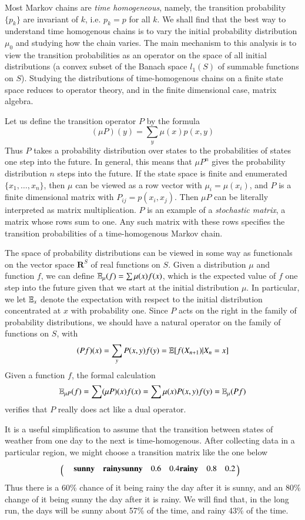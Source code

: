Most Markov chains are \emph{time homogeneous}, namely, the transition probability $\{ p_k \}$ are invariant of $k$, i.e. $p_k = p$ for all $k$. We shall find that the best way to understand time homogenous chains is to vary the initial probability distribution $\mu_0$ and studying how the chain varies. The main mechanism to this analysis is to view the transition probabilities as an operator on the space of all initial distributions (a convex subset of the Banach space $l_1(S)$ of summable functions on $S$). Studying the distributions of time-homogenous chains on a finite state space reduces to operator theory, and in the finite dimensional case, matrix algebra.

Let us define the transition operator $P$ by the formula
%
\[ (\mu P)(y) = \sum_y \mu(x) p(x,y) \]
%
Thus $P$ takes a probability distribution over states to the probabilities of states one step into the future. In general, this means that $\mu P^n$ gives the probability distribution $n$ steps into the future. If the state space is finite and enumerated $\{ x_1, \dots, x_n \}$, then $\mu$ can be viewed as a row vector with $\mu_i = \mu(x_i)$, and $P$ is a finite dimensional matrix with $P_{ij} = p(x_i,x_j)$. Then $\mu P$ can be literally interpreted as matrix multiplication. $P$ is an example of a \emph{stochastic matrix}, a matrix whose rows sum to one. Any such matrix with these rows specifies the transition probabilities of a time-homogenous Markov chain.

The space of probability distributions can be viewed in some way as functionals on the vector space $\mathbf{R}^S$ of real functions on $S$. Given a distribution $\mu$ and function $f$, we can define $\operatorname{\mathbb{E}}_\mu(f) = \sum \mu(x)f(x)$, which is the expected value of $f$ one step into the future given that we start at the initial distribution $\mu$. In particular, we let $\operatorname{\mathbb{E}}_x$ denote the expectation with respect to the initial distribution concentrated at $x$ with probability one. Since $P$ acts on the right in the family of probability distributions, we should have a natural operator on the family of functions on $S$, with
%
\[ (Pf)(x) = \sum_y P(x,y) f(y) = \operatorname{\mathbb{E}}[f(X_{n+1})|X_n = x] \]
%
Given a function $f$, the formal calculation
%
\[ \operatorname{\mathbb{E}}_{\mu P}(f) = \sum (\mu P)(x) f(x) = \sum \mu(x) P(x,y) f(y) = \operatorname{\mathbb{E}}_\mu(Pf) \]
%
verifies that $P$ really does act like a dual operator.

\begin{example}
    It is a useful simplification to assume that the transition between states of weather from one day to the next is time-homogenous. After collecting data in a particular region, we might choose a transition matrix like the one below
    \[
  \bordermatrix{
    & {\bf sunny} & {\bf rainy} \\
    {\bf sunny} & 0.6 & 0.4 \\
    {\bf rainy} & 0.8 & 0.2
  }
\]
    Thus there is a 60\% chance of it being rainy the day after it is sunny, and an 80\% change of it being sunny the day after it is rainy. We will find that, in the long run, the days will be sunny about 57\% of the time, and rainy 43\% of the time.
\end{example}

